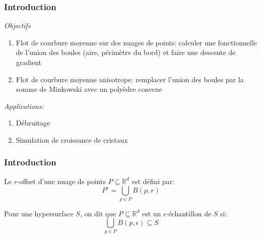 \documentclass{beamer}
\begin{document}
\begin{frame}
    \frametitle{Introduction}

    \emph{Objectifs}
    \begin{enumerate}
        \item Flot de courbure moyenne sur des nuages de points: calculer une
            fonctionnelle de l'union des boules (aire, périmètre du bord) et
            faire une descente de gradient
        \item Flot de courbure moyenne anisotrope: remplacer l'union des boules
            par la somme de Minkowski avec un polyèdre convexe
    \end{enumerate}

    \emph{Applications:}
    \begin{enumerate}
        \item Débruitage
        \item Simulation de croissance de cristaux
    \end{enumerate}
\end{frame}

\begin{frame}
    \frametitle{Introduction}

    \begin{definition}
        Le $r$-offset d'une nuage de points $ P \subseteq \mathbb{R}^d $ est
        défini par:
        $$ P^r = \bigcup_{p \in P} B(p, r) $$
    \end{definition}

    \begin{definition}
        Pour une hypersurface $ S $, on dit que $ P \subseteq \mathbb{R}^d $ est
        un $\epsilon$-échantillon de $ S $ si:
        $$ \bigcup_{p \in P} B(p, \epsilon) \subseteq S $$
    \end{definition}
\end{frame}
\end{document}

